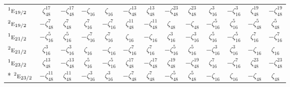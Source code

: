 \documentclass[10pt,a4paper]{article}
\numberwithin{equation}{section}
\newcommand{\irr}[1]{\text{\normalfont\scshape #1}}
\newcommand{\conjpair}[1]{{}^{#1}}
\newcommand{\rootunity}[1]{\zeta_{#1}}
\begin{document}
{\begin{longtable}{@{}lcccccccccccc@{}}
$\conjpair{1}\irr{e}_{19/2}$ & $\rootunity{48}^{17}$ & $-\rootunity{48}^{17}$ & $-\rootunity{16}$ & $\rootunity{16}$ & $-\rootunity{48}^{13}$ & $\rootunity{48}^{13}$ & $-\rootunity{48}^{23}$ & $\rootunity{48}^{23}$ & $\rootunity{16}^{3}$ & $-\rootunity{16}^{3}$ & $\rootunity{48}^{19}$ & $-\rootunity{48}^{19}$\\
$\conjpair{2}\irr{e}_{19/2}$ & $-\rootunity{48}^{7}$ & $\rootunity{48}^{7}$ & $\rootunity{16}^{7}$ & $-\rootunity{16}^{7}$ & $\rootunity{48}^{11}$ & $-\rootunity{48}^{11}$ & $\rootunity{48}$ & $-\rootunity{48}$ & $-\rootunity{16}^{5}$ & $\rootunity{16}^{5}$ & $-\rootunity{48}^{5}$ & $\rootunity{48}^{5}$\\
$\conjpair{1}\irr{e}_{21/2}$ & $-\rootunity{16}^{5}$ & $\rootunity{16}^{5}$ & $-\rootunity{16}^{7}$ & $\rootunity{16}^{7}$ & $\rootunity{16}$ & $-\rootunity{16}$ & $\rootunity{16}^{3}$ & $-\rootunity{16}^{3}$ & $\rootunity{16}^{5}$ & $-\rootunity{16}^{5}$ & $\rootunity{16}^{7}$ & $-\rootunity{16}^{7}$\\
$\conjpair{2}\irr{e}_{21/2}$ & $\rootunity{16}^{3}$ & $-\rootunity{16}^{3}$ & $\rootunity{16}$ & $-\rootunity{16}$ & $-\rootunity{16}^{7}$ & $\rootunity{16}^{7}$ & $-\rootunity{16}^{5}$ & $\rootunity{16}^{5}$ & $-\rootunity{16}^{3}$ & $\rootunity{16}^{3}$ & $-\rootunity{16}$ & $\rootunity{16}$\\
$\conjpair{1}\irr{e}_{23/2}$ & $\rootunity{48}^{13}$ & $-\rootunity{48}^{13}$ & $\rootunity{16}^{5}$ & $-\rootunity{16}^{5}$ & $\rootunity{48}^{17}$ & $-\rootunity{48}^{17}$ & $\rootunity{48}^{19}$ & $-\rootunity{48}^{19}$ & $\rootunity{16}^{7}$ & $-\rootunity{16}^{7}$ & $\rootunity{48}^{23}$ & $-\rootunity{48}^{23}$\\*
$\conjpair{2}\irr{e}_{23/2}$ & $-\rootunity{48}^{11}$ & $\rootunity{48}^{11}$ & $-\rootunity{16}^{3}$ & $\rootunity{16}^{3}$ & $-\rootunity{48}^{7}$ & $\rootunity{48}^{7}$ & $-\rootunity{48}^{5}$ & $\rootunity{48}^{5}$ & $-\rootunity{16}$ & $\rootunity{16}$ & $-\rootunity{48}$ & $\rootunity{48}$\\
\bottomrule\end{longtable}}
\end{document}
